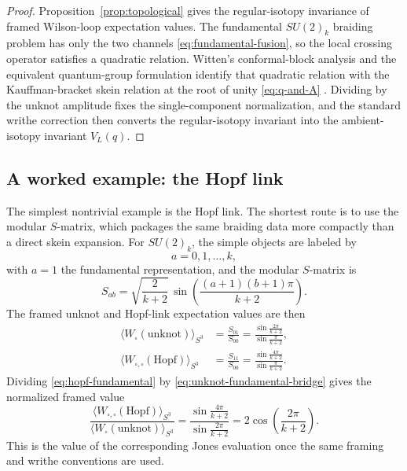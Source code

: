 \begin{proof}
Proposition~\ref{prop:topological} gives the regular-isotopy invariance of framed Wilson-loop expectation values. The fundamental $SU(2)_k$ braiding problem has only the two channels \eqref{eq:fundamental-fusion}, so the local crossing operator satisfies a quadratic relation. Witten's conformal-block analysis and the equivalent quantum-group formulation identify that quadratic relation with the Kauffman-bracket skein relation at the root of unity \eqref{eq:q-and-A} \cite{Witten1989Jones,ReshetikhinTuraev1991}. Dividing by the unknot amplitude fixes the single-component normalization, and the standard writhe correction then converts the regular-isotopy invariant into the ambient-isotopy invariant $V_L(q)$.
\end{proof}

\subsection{A worked example: the Hopf link}

The simplest nontrivial example is the Hopf link. The shortest route is to use the modular $S$-matrix, which packages the same braiding data more compactly than a direct skein expansion. For $SU(2)_k$, the simple objects are labeled by
\begin{equation}\label{eq:su2-labels}
a=0,1,\ldots,k,
\end{equation}
with $a=1$ the fundamental representation, and the modular $S$-matrix is
\begin{equation}\label{eq:su2-S-matrix}
S_{ab}
=
\sqrt{\frac{2}{k+2}}\,
\sin\!\left(\frac{(a+1)(b+1)\pi}{k+2}\right).
\end{equation}
The framed unknot and Hopf-link expectation values are then
\begin{align}
\bigl\langle W_{\square}(\text{unknot})\bigr\rangle_{S^3}
&=
\frac{S_{01}}{S_{00}}
=
\frac{\sin\frac{2\pi}{k+2}}{\sin\frac{\pi}{k+2}}, \label{eq:unknot-fundamental-bridge} \\[1mm]
\bigl\langle W_{\square,\square}(\text{Hopf})\bigr\rangle_{S^3}
&=
\frac{S_{11}}{S_{00}}
=
\frac{\sin\frac{4\pi}{k+2}}{\sin\frac{\pi}{k+2}}. \label{eq:hopf-fundamental}
\end{align}
Dividing \eqref{eq:hopf-fundamental} by \eqref{eq:unknot-fundamental-bridge} gives the normalized framed value
\begin{equation}\label{eq:hopf-normalized}
\frac{\bigl\langle W_{\square,\square}(\text{Hopf})\bigr\rangle_{S^3}}
{\bigl\langle W_{\square}(\text{unknot})\bigr\rangle_{S^3}}
=
\frac{\sin\frac{4\pi}{k+2}}{\sin\frac{2\pi}{k+2}}
=
2\cos\!\left(\frac{2\pi}{k+2}\right).
\end{equation}
This is the value of the corresponding Jones evaluation once the same framing and writhe conventions are used.

